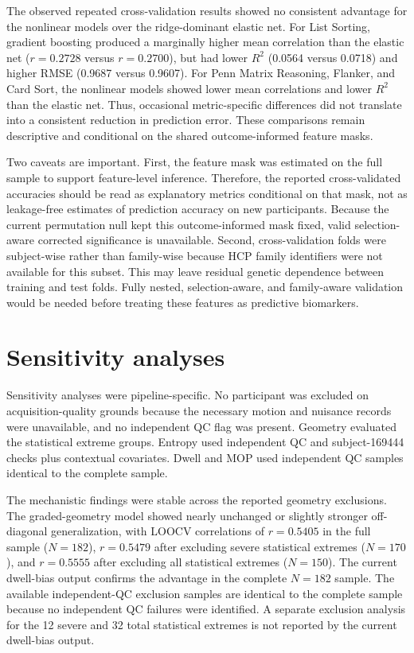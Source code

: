 \documentclass[12pt,a4paper]{report}
\begin{document}
The observed repeated cross-validation results showed no consistent advantage for the nonlinear
models over the ridge-dominant elastic net. For List Sorting, gradient boosting produced a
marginally higher mean correlation than the elastic net ($r=0.2728$ versus $r=0.2700$), but
had lower $R^2$ (0.0564 versus 0.0718) and higher RMSE (0.9687 versus 0.9607). For Penn
Matrix Reasoning, Flanker, and Card Sort, the nonlinear models showed lower mean correlations
and lower $R^2$ than the elastic net. Thus, occasional metric-specific differences did not
translate into a consistent reduction in prediction error. These comparisons remain descriptive
and conditional on the shared outcome-informed feature masks.

Two caveats are important. First, the feature mask was estimated on the full sample to support feature-level inference. Therefore, the reported cross-validated accuracies should be read as explanatory metrics conditional on that mask, not as leakage-free estimates of prediction accuracy on new participants. Because the current permutation null kept this outcome-informed mask fixed, valid selection-aware corrected significance is unavailable. Second, cross-validation folds were subject-wise rather than family-wise because HCP family identifiers were not available for this subset. This may leave residual genetic dependence between training and test folds. Fully nested, selection-aware, and family-aware validation would be needed before treating these features as predictive biomarkers.

\section{Sensitivity analyses}

Sensitivity analyses were pipeline-specific. No participant was excluded on acquisition-quality grounds because the necessary motion and nuisance records were unavailable, and no independent QC flag was present. Geometry evaluated the statistical extreme groups. Entropy used independent QC and subject-169444 checks plus contextual covariates. Dwell and MOP used independent QC samples identical to the complete sample.

The mechanistic findings were stable across the reported geometry exclusions. The graded-geometry model showed nearly unchanged or slightly stronger off-diagonal generalization, with LOOCV correlations of $r=0.5405$ in the full sample ($N=182$), $r=0.5479$ after excluding severe statistical extremes ($N=170$), and $r=0.5555$ after excluding all statistical extremes ($N=150$). The current dwell-bias output confirms the advantage in the complete $N=182$ sample. The available independent-QC exclusion samples are identical to the complete sample because no independent QC failures were identified. A separate exclusion analysis for the 12 severe and 32 total statistical extremes is not reported by the current dwell-bias output.
\end{document}
